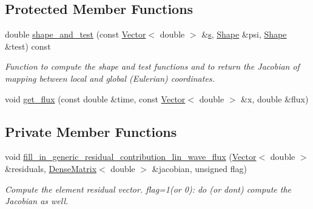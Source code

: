 \subsection*{Protected Member Functions}
\begin{DoxyCompactItemize}
\item 
double \hyperlink{classoomph_1_1LinearWaveFluxElement_ae9568e5e47bea6bbcb17ef1b88a2845b}{shape\+\_\+and\+\_\+test} (const \hyperlink{classoomph_1_1Vector}{Vector}$<$ double $>$ \&\hyperlink{cfortran_8h_ab7123126e4885ef647dd9c6e3807a21c}{s}, \hyperlink{classoomph_1_1Shape}{Shape} \&psi, \hyperlink{classoomph_1_1Shape}{Shape} \&test) const
\begin{DoxyCompactList}\small\item\em Function to compute the shape and test functions and to return the Jacobian of mapping between local and global (Eulerian) coordinates. \end{DoxyCompactList}\item 
void \hyperlink{classoomph_1_1LinearWaveFluxElement_a969d93f5e289c16d581da0851fcd89e7}{get\+\_\+flux} (const double \&time, const \hyperlink{classoomph_1_1Vector}{Vector}$<$ double $>$ \&x, double \&flux)
\end{DoxyCompactItemize}
\subsection*{Private Member Functions}
\begin{DoxyCompactItemize}
\item 
void \hyperlink{classoomph_1_1LinearWaveFluxElement_abde1eec8fa1a4c1ff97c1cd33fe1c727}{fill\+\_\+in\+\_\+generic\+\_\+residual\+\_\+contribution\+\_\+lin\+\_\+wave\+\_\+flux} (\hyperlink{classoomph_1_1Vector}{Vector}$<$ double $>$ \&residuals, \hyperlink{classoomph_1_1DenseMatrix}{Dense\+Matrix}$<$ double $>$ \&jacobian, unsigned flag)
\begin{DoxyCompactList}\small\item\em Compute the element residual vector. flag=1(or 0)\+: do (or don\textquotesingle{}t) compute the Jacobian as well. \end{DoxyCompactList}\end{DoxyCompactItemize}
